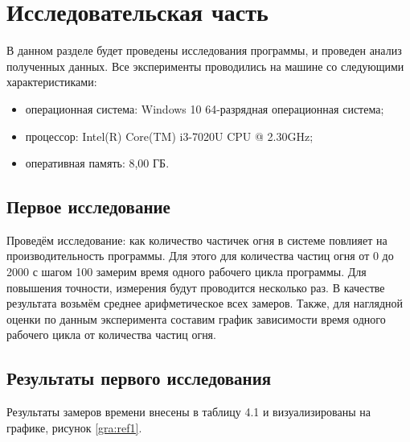 \documentclass[a4paper,14pt]{report}
\begin{document}
\chapter{Исследовательская часть}
В данном разделе будет проведены исследования программы, и проведен анализ полученных данных.
Все эксперименты проводились на машине со следующими характеристиками:
\begin{itemize}
 \item операционная система: Windows 10 64-разрядная операционная система;
 \item процессор: Intel(R) Core(TM) i3-7020U CPU @ 2.30GHz;
 \item оперативная память: 8,00 ГБ.
\end{itemize}
\section{Первое исследование}
Проведём исследование: как количество частичек огня в системе повлияет на производительность программы.
Для этого для количества частиц огня от 0 до 2000 с шагом 100 замерим время одного рабочего цикла программы. 
Для повышения точности, измерения будут проводится несколько раз. В качестве результата возьмём среднее арифметическое всех замеров. Также, для наглядной оценки по данным эксперимента составим график зависимости время одного рабочего цикла от количества частиц огня.

\section{Результаты первого исследования}
Результаты замеров времени внесены в таблицу 4.1 и визуализированы на графике, рисунок \ref{gra:ref1}.
\newline
\end{document}

